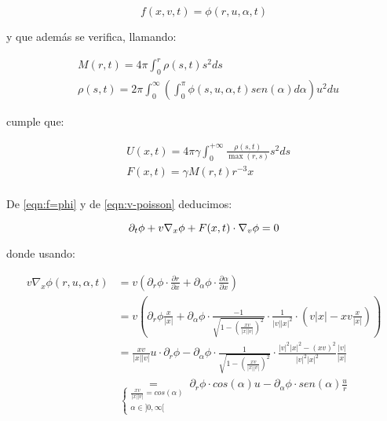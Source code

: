 \documentclass[a4paper,10pt]{scrartcl}
\theoremstyle{definition}
\numberwithin{equation}{section}
\begin{document}
\begin{equation}
\label{eqn:f=phi}
f(x,v,t) = \phi(r,u,\alpha, t)
\end{equation}

y que además se verifica, llamando:

\begin{align*}
 & M(r,t) = 4\pi \int_0^r \rho(s,t) s^2 ds\\
 & \rho(s, t) = 2\pi \int_0^{\infty} \left(\int_0^\pi \phi(s, u, \alpha, t) sen(\alpha) d\alpha \right)u^2 du
\end{align*}

cumple que:

\begin{align*}
 & U(x,t) = 4\pi\gamma \int_0^{+\infty} \frac{\rho(s,t)}{\max(r,s)} s^2 ds\\
 & F(x,t) = \gamma M(r,t) r^{-3} x\\
\end{align*}

De \eqref{eqn:f=phi} y de \eqref{eqn:v-poisson} deducimos:

\[
\partial_t \phi + v \nabla_x \phi + F(x,t) \cdot \nabla_v \phi = 0\\
\]

donde usando:

\begin{align*}
 v \nabla_x \phi(r, u, \alpha, t) &= v \left(\partial_r \phi \cdot \frac{\partial r}{\partial x} + \partial_\alpha \phi \cdot \frac{\partial \alpha}{\partial x} \right)\\
 &= v\left(\partial_r \phi \frac{x}{|x|} + \partial_\alpha \phi \cdot \frac{-1}{\sqrt{1 - \left(\frac{xv}{|x||v|}\right)^2}} \cdot \frac{1}{|v||x|^2} \cdot\left(v|x| - xv \frac{x}{|x|}\right)\right)\\
 &= \frac{xv}{|x||v|} u \cdot\partial_r \phi - \partial_\alpha \phi \cdot \frac{1}{\sqrt{1 - \left(\frac{xv}{|x||v|}\right)^2}} \cdot \frac{|v|^2|x|^2 - (xv)^2}{|v|^2|x|^2} \frac{|v|}{|x|}\\
 &\underset{\left\{\begin{array}{c} \frac{xv}{|x||v|} = cos(\alpha)\\ \alpha \in ]0,\infty[\end{array}\right.}{=} \partial_r \phi \cdot cos(\alpha) u - \partial_\alpha \phi \cdot sen(\alpha) \frac{u}{r}
\end{align*}
\end{document}
